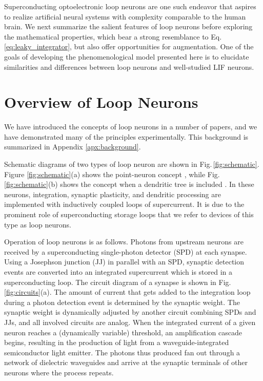 \documentclass[twocolumn]{article}
\begin{document}
Superconducting optoelectronic loop neurons are one such endeavor that aspires to realize artificial neural systems with complexity comparable to the human brain. We next summarize the salient features of loop neurons before exploring the mathematical properties, which bear a strong resemblance to Eq.\,\ref{eq:leaky_integrator}, but also offer opportunities for augmentation. One of the goals of developing the phenomenological model presented here is to elucidate similarities and differences between loop neurons and well-studied LIF neurons. 

\section{\label{sec:overview_of_loop_neurons}Overview of Loop Neurons}
We have introduced the concepts of loop neurons in a number of papers, and we have demonstrated many of the principles experimentally. This background is summarized in Appendix \ref{apx:background}. 

Schematic diagrams of two types of loop neuron are shown in Fig.\,\ref{fig:schematic}. Figure \ref{fig:schematic}(a) shows the point-neuron concept \cite{sh2018,sh2019_jap}, while Fig.\,\ref{fig:schematic}(b) shows the concept when a dendritic tree is included \cite{sh2019_jstqe}. In these neurons, integration, synaptic plasticity, and dendritic processing are implemented with inductively coupled loops of supercurrent. It is due to the prominent role of superconducting storage loops that we refer to devices of this type as loop neurons. 

Operation of loop neurons is as follows. Photons from upstream neurons are received by a superconducting single-photon detector (SPD) at each synapse. Using a Josephson junction (JJ) in parallel with an SPD, synaptic detection events are converted into an integrated supercurrent which is stored in a superconducting loop. The circuit diagram of a synapse is shown in Fig.\,\ref{fig:circuits}(a). The amount of current that gets added to the integration loop during a photon detection event is determined by the synaptic weight. The synaptic weight is dynamically adjusted by another circuit combining SPDs and JJs, and all involved circuits are analog. When the integrated current of a given neuron reaches a (dynamically variable) threshold, an amplification cascade begins, resulting in the production of light from a waveguide-integrated semiconductor light emitter. The photons thus produced fan out through a network of dielectric waveguides and arrive at the synaptic terminals of other neurons where the process repeats. 
\end{document}
